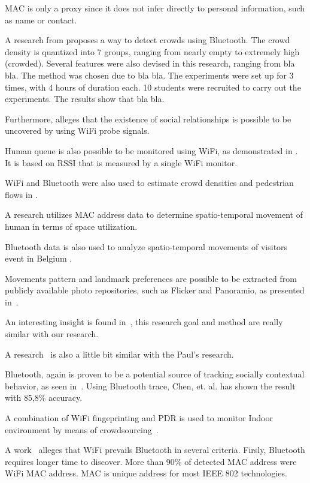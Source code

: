 \documentclass{article}
\begin{document}
MAC is only a proxy since it does not infer directly to personal information, such as name or contact.

A research from \cite{thesis008} proposes a way to detect crowds using Bluetooth. The crowd density is quantized into 7 groups, ranging from nearly empty to extremely high (crowded). Several features were also devised in this research, ranging from bla bla. 
The method was chosen due to bla bla.
The experiments were set up for 3 times, with 4 hours of duration each. 10 students were recruited to carry out the experiments.
The results show that bla bla.

Furthermore, \cite{thesis014} alleges that the existence of social relationships is possible to be uncovered by using WiFi probe signals.

Human queue is also possible to be monitored using WiFi, as demonstrated in \cite{thesis012}. It is based on RSSI that is measured by a single WiFi monitor.

WiFi and Bluetooth were also used to estimate crowd densities and pedestrian flows in \cite{thesis011}.

A research \cite{thesis017} utilizes MAC address data to determine spatio-temporal movement of human in terms of space utilization.

Bluetooth data is also used to analyze spatio-temporal movements of visitors event in Belgium \cite{thesis016}.

Movements pattern and landmark preferences are possible to be extracted from publicly available photo repositories, such as Flicker and Panoramio, as presented in~\cite{thesis026}.

An interesting insight is found in~\cite{thesis031}, this research goal and method are really similar with our research.

A research~\cite{thesis030} is also a little bit similar with the Paul's research.

Bluetooth, again is proven to be a potential source of tracking socially contextual behavior, as seen in~\cite{thesis028}. Using Bluetooth trace, Chen, et. al. has shown the result with 85,8\% accuracy.

A combination of WiFi fingeprinting and PDR is used to monitor Indoor environment by means of crowdsourcing~\cite{thesis020}.

A work~\cite{thesis009} alleges that WiFi prevails Bluetooth in several criteria. Firsly, Bluetooth requires longer time to discover. More than 90\% of detected MAC address were WiFi MAC address. MAC is unique address for most IEEE 802 technologies.
\end{document}
